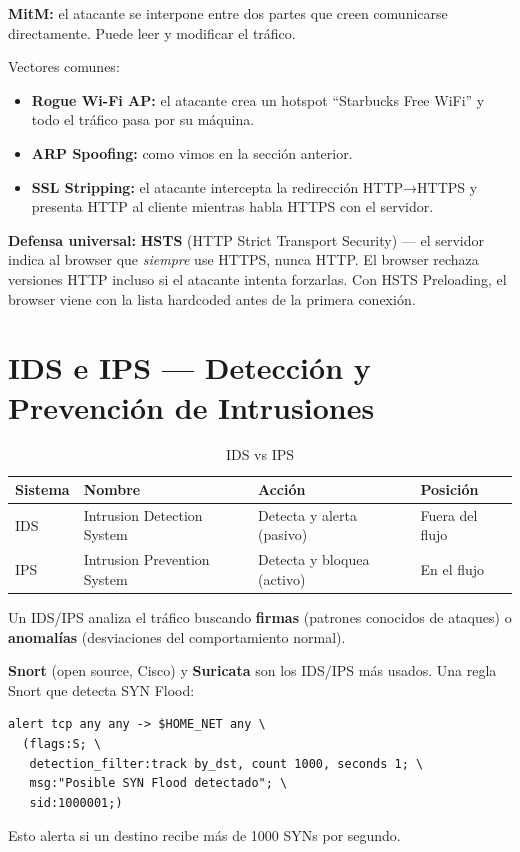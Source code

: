 \begin{cuidado}
\textbf{MitM:} el atacante se interpone entre dos partes que creen comunicarse
directamente. Puede leer y modificar el tráfico.

Vectores comunes:
\begin{itemize}
    \item \textbf{Rogue Wi-Fi AP:} el atacante crea un hotspot ``Starbucks Free WiFi''
          y todo el tráfico pasa por su máquina.
    \item \textbf{ARP Spoofing:} como vimos en la sección anterior.
    \item \textbf{SSL Stripping:} el atacante intercepta la redirección HTTP→HTTPS
          y presenta HTTP al cliente mientras habla HTTPS con el servidor.
\end{itemize}

\textbf{Defensa universal:} \textbf{HSTS} (HTTP Strict Transport Security) ---
el servidor indica al browser que \textit{siempre} use HTTPS, nunca HTTP.
El browser rechaza versiones HTTP incluso si el atacante intenta forzarlas.
Con HSTS Preloading, el browser viene con la lista hardcoded antes de la primera
conexión.
\end{cuidado}

\section{ IDS e IPS --- Detección y Prevención de Intrusiones}

\begin{table}[h!]
\centering
\renewcommand{\arraystretch}{1.4}
\begin{tabular}{llll}
\toprule
\textbf{Sistema} & \textbf{Nombre} & \textbf{Acción} & \textbf{Posición} \\
\midrule
IDS & Intrusion Detection System  & Detecta y alerta (pasivo)  & Fuera del flujo \\
IPS & Intrusion Prevention System & Detecta y bloquea (activo) & En el flujo \\
\bottomrule
\end{tabular}
\caption{IDS vs IPS}
\end{table}

Un IDS/IPS analiza el tráfico buscando \textbf{firmas} (patrones conocidos de
ataques) o \textbf{anomalías} (desviaciones del comportamiento normal).

\begin{ejemplo}
\textbf{Snort} (open source, Cisco) y \textbf{Suricata} son los IDS/IPS más
usados. Una regla Snort que detecta SYN Flood:

\begin{lstlisting}
alert tcp any any -> $HOME_NET any \
  (flags:S; \
   detection_filter:track by_dst, count 1000, seconds 1; \
   msg:"Posible SYN Flood detectado"; \
   sid:1000001;)
\end{lstlisting}

Esto alerta si un destino recibe más de 1000 SYNs por segundo.
\end{ejemplo}

